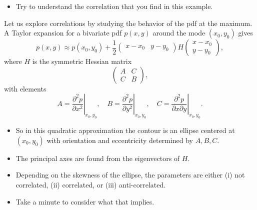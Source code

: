 \documentclass[%
oneside,                 %
final,                   %
10pt]{article}
\begin{document}
\begin{itemize}
\item Try to understand the correlation that you find in this example.
\end{itemize}

\noindent
Let us explore correlations by studying the behavior of the pdf at the maximum.
A Taylor expansion for a bivariate pdf $p(x,y)$ around the mode $(x_0,y_0)$ gives
\[
p(x,y) \approx p(x_0,y_0) + \frac{1}{2} \begin{pmatrix} x-x_0 & y-y_0 \end{pmatrix}
H
\begin{pmatrix} x-x_0 \\ y-y_0 \end{pmatrix},
\]
where $H$ is the symmetric Hessian matrix
\[
\begin{pmatrix}
A & C \\ C & B
\end{pmatrix}, 
\]
with elements
\[
A = \left. \frac{\partial^2 p}{\partial x^2} \right|_{x_0,y_0}, \quad
B = \left. \frac{\partial^2 p}{\partial y^2} \right|_{x_0,y_0}, \quad
C = \left. \frac{\partial^2 p}{\partial x \partial y} \right|_{x_0,y_0}.
\]


\begin{itemize}
\item So in this quadratic approximation the contour is an ellipse centered at $(x_0,y_0)$ with orientation and eccentricity determined by $A,B,C$.

\item The principal axes are found from the eigenvectors of $H$.

\item Depending on the skewness of the ellipse, the parameters are either (i) not correlated, (ii) correlated, or (iii) anti-correlated.

\item Take a minute to consider what that implies.
\end{itemize}

\noindent


\end{document}
